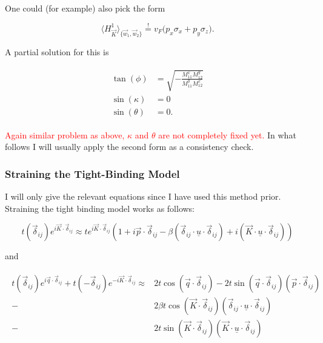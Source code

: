 \documentclass[../../../main.tex]{subfiles}
\begin{document}
One could (for example) also pick the form

\begin{equation}
	\langle H_{\vec{K}}^1 \rangle_{\{\vec{w}_1, \vec{w}_2\}} \overset{!}{=} v_F\big(p_x\sigma_x + p_y \sigma_z\big).	
\end{equation}

A partial solution for this is

\begin{align}
	\begin{split}
		\tan(\phi) &= \sqrt{-\frac{M_{11}^x M_{12}^y}{M_{11}^y M_{12}^x}} \\
		\sin(\kappa) &= 0 \\
		\sin(\theta) &= 0.
	\end{split}
\end{align}

\textcolor{red}{Again similar problem as above, $\kappa$ and $\theta$ are not completely fixed yet.} In what follows I will usually apply the second form as a consistency check.

\subsubsection{Straining the Tight-Binding Model}

I will only give the relevant equations since I have used this method prior. Straining the tight binding model works as follows:

\begin{equation}
	t(\vec{\delta}_{ij})e^{i\vec{K}\cdot\vec{\delta}_{ij}}  \approx t e^{i\vec{K}\cdot\vec{\delta}_{ij}}\left(1+i\vec{p}\cdot\vec{\delta}_{ij} - \beta \left( \vec{\delta}_{ij} \cdot \underline{u} \cdot \vec{\delta}_{ij}\right) + i \left(\vec{K} \cdot \underline{u} \cdot \vec{\delta}_{ij}\right)\right)
\end{equation}

and 

\begin{align}
	\begin{split}
		t(\vec{\delta}_{ij})e^{i\vec{q}\cdot\vec{\delta}_{ij}} + t(-\vec{\delta}_{ij})e^{-i\vec{K}\cdot\vec{\delta}_{ij}}  \approx & 2t\cos(	\vec{q}\cdot\vec{\delta}_{ij}) - 2t\sin(\vec{q} \cdot \vec{\delta}_{ij})\left(\vec{p}\cdot\vec{\delta}_{ij}\right) \\
		-&2\beta t\cos(\vec{K}\cdot\vec{\delta}_{ij})\left(\vec{\delta}_{ij} \cdot \underline{u} \cdot \vec{\delta}_{ij} \right) \\
		-&2t\sin(\vec{K}\cdot\vec{\delta}_{ij})\left(\vec{K} \cdot \underline{u} \cdot \vec{\delta}_{ij}\right)
	\end{split}
\end{align}
\end{document}
